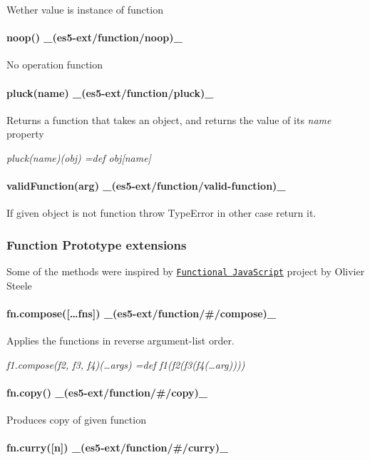 Wether value is instance of function

\paragraph*{noop() \+\_\+(es5-\/ext/function/noop)\+\_\+}

No operation function

\paragraph*{pluck(name) \+\_\+(es5-\/ext/function/pluck)\+\_\+}

Returns a function that takes an object, and returns the value of its {\itshape name} property

{\itshape pluck(name)(obj) =def obj\mbox{[}name\mbox{]}}

\paragraph*{valid\+Function(arg) \+\_\+(es5-\/ext/function/valid-\/function)\+\_\+}

If given object is not function throw Type\+Error in other case return it.

\subsubsection*{Function Prototype extensions}

Some of the methods were inspired by \href{http://osteele.com/sources/javascript/functional/}{\tt Functional Java\+Script} project by Olivier Steele

\paragraph*{fn.\+compose(\mbox{[}…fns\mbox{]}) \+\_\+(es5-\/ext/function/\#/compose)\+\_\+}

Applies the functions in reverse argument-\/list order.

{\itshape f1.\+compose(f2, f3, f4)(…args) =def f1(f2(f3(f4(…arg))))}

\paragraph*{fn.\+copy() \+\_\+(es5-\/ext/function/\#/copy)\+\_\+}

Produces copy of given function

\paragraph*{fn.\+curry(\mbox{[}n\mbox{]}) \+\_\+(es5-\/ext/function/\#/curry)\+\_\+}

